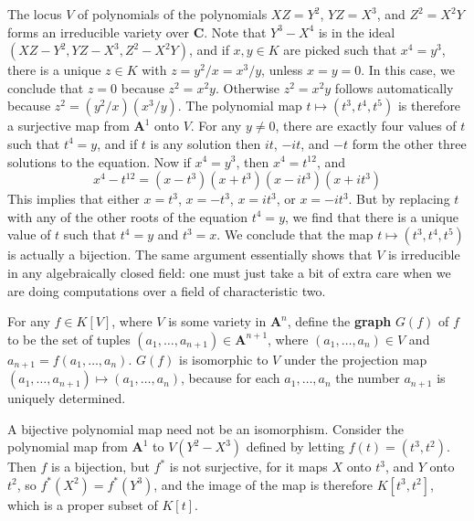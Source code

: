 \begin{example}
    The locus $V$ of polynomials of the polynomials $XZ = Y^2$, $YZ = X^3$, and $Z^2 = X^2Y$ forms an irreducible variety over $\mathbf{C}$. Note that $Y^3 - X^4$ is in the ideal $(XZ - Y^2, YZ - X^3, Z^2 - X^2Y)$, and if $x,y \in K$ are picked such that $x^4 = y^3$, there is a unique $z \in K$ with $z = y^2/x = x^3/y$, unless $x = y = 0$. In this case, we conclude that $z = 0$ because $z^2 = x^2y$. Otherwise $z^2 = x^2y$ follows automatically because $z^2 = (y^2/x)(x^3/y)$. The polynomial map $t \mapsto (t^3,t^4,t^5)$ is therefore a surjective map from $\mathbf{A}^1$ onto $V$. For any $y \neq 0$, there are exactly four values of $t$ such that $t^4 = y$, and if $t$ is any solution then $it$, $-it$, and $-t$ form the other three solutions to the equation. Now if $x^4 = y^3$, then $x^4 = t^{12}$, and
    \[ x^4 - t^{12} = (x - t^3)(x + t^3)(x - it^3)(x + it^3) \]
    This implies that either $x = t^3$, $x = -t^3$, $x = it^3$, or $x = -it^3$. But by replacing $t$ with any of the other roots of the equation $t^4 = y$, we find that there is a unique value of $t$ such that $t^4 = y$ and $t^3 = x$. We conclude that the map $t \mapsto (t^3,t^4,t^5)$ is actually a bijection. The same argument essentially shows that $V$ is irreducible in any algebraically closed field: one must just take a bit of extra care when we are doing computations over a field of characteristic two.
\end{example}

\begin{example}
    For any $f \in K[V]$, where $V$ is some variety in $\mathbf{A}^n$, define the {\bf graph} $G(f)$ of $f$ to be the set of tuples $(a_1, \dots, a_{n+1}) \in \mathbf{A}^{n+1}$, where $(a_1, \dots, a_n) \in V$ and $a_{n+1} = f(a_1, \dots, a_n)$. $G(f)$ is isomorphic to $V$ under the projection map $(a_1, \dots, a_{n+1}) \mapsto (a_1, \dots, a_n)$, because for each $a_1, \dots, a_n$ the number $a_{n+1}$ is uniquely determined.
\end{example}

\begin{example}
    A bijective polynomial map need not be an isomorphism. Consider the polynomial map from $\mathbf{A}^1$ to $V(Y^2-X^3)$ defined by letting $f(t) = (t^3,t^2)$. Then $f$ is a bijection, but $f^*$ is not surjective, for it maps $X$ onto $t^3$, and $Y$ onto $t^2$, so $f^*(X^2) = f^*(Y^3)$, and the image of the map is therefore $K[t^3,t^2]$, which is a proper subset of $K[t]$.
\end{example}


